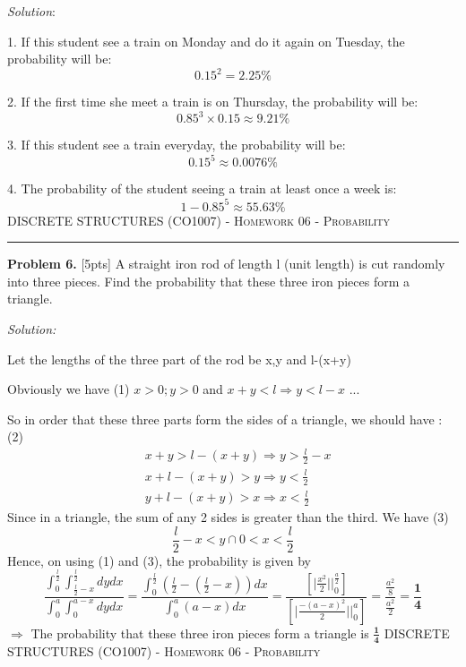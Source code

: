 \documentclass[12pt]{amsart}
\begin{document}
\textit{Solution}:

1. If this student see a train on Monday and do it again on Tuesday, the probability will be:   \[0.15^2 = \mathbf{2.25\%}\]

2. If the first time she meet a train is on Thursday, the probability will be:
\[0.85^3\times 0.15 \approx \mathbf{9.21\%} \]

3. If this student see a train everyday, the probability will be:
\[0.15^5 \approx \mathbf{0.0076\%}\]

4. The probability of the student seeing a train at least once a week is:
\[1-0.85^5 \approx \mathbf{55.63}\%\]
\newpage
{\scshape } \hfill {\scshape DISCRETE STRUCTURES (CO1007) - Homework 06 - Probability} \hfill {\scshape }
 
\smallskip

\hrule

\bigskip

\bigskip 
\textbf{Problem 6.} [5pts] A straight iron rod of length l (unit length) is cut randomly into three pieces. Find the
probability that these three iron pieces form a triangle.

\textit{Solution:}

Let the lengths of the three part of the rod be x,y and l-(x+y)

Obviously we have (1) $\displaystyle x>0; y>0$ and 
$\displaystyle x+y < l \Rightarrow y<l-x$  ...

So in order that these three parts form the sides of a triangle, we should have : (2)
\begin{align*}
    &x+y>l-(x+y)\Rightarrow y>\frac{l}{2}-x\\
    &x+l-(x+y)>y\Rightarrow y<\frac{l}{2}\\
    &y+l-(x+y)>x\Rightarrow x<\frac{l}{2}
\end{align*}
Since in a triangle, the sum of any 2 sides is greater than the third. We have (3)
\[\frac{l}{2}-x<y \cap 0<x<\frac{l}{2}\]
Hence, on using (1) and (3), the probability is given by
\[\frac{\int_{0}^\frac{l}{2}\int_{\frac{l}{2}-x}^\frac{l}{2}dydx}{\int_{0}^a\int_{0}^{a-x}dydx}=\frac{\int_{0}^\frac{l}{2}\left(\frac{l}{2}-\left(\frac{l}{2}-x\right)\right)dx}{\int_{0}^a(a-x)dx}=\frac{\left[\lvert\frac{x^2}{2}\rvert\Big|_0^\frac{a}{2}\right]}{\left[\lvert\frac{-(a-x)^2}{2}\rvert\Big|_0^a\right]}=\frac{\frac{a^2}{8}}{\frac{a^2}{2}}=\mathbf{\frac{1}{4}}\]
$\displaystyle \Rightarrow$ The probability that these three iron pieces form a triangle is $\displaystyle \mathbf{\frac{1}{4}}$
\newpage
{\scshape } \hfill {\scshape DISCRETE STRUCTURES (CO1007) - Homework 06 - Probability} \hfill {\scshape }
 
\end{document}
